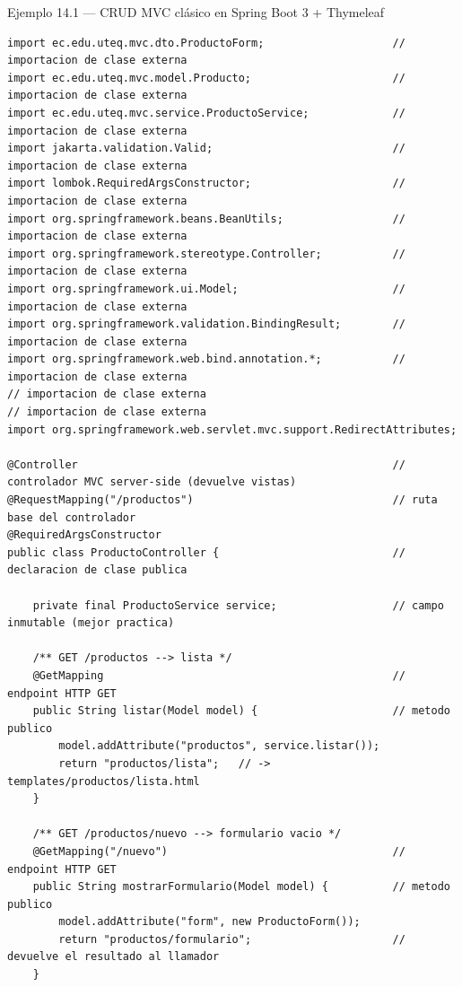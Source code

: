 \documentclass[11pt,a4paper,openany]{book}
\begin{document}
\begin{cajaejemplo}{Ejemplo 14.1 --- CRUD MVC clásico en Spring Boot 3 + Thymeleaf}
\begin{lstlisting}[style=java,caption={ProductoController.java},label=lst:14.6]
import ec.edu.uteq.mvc.dto.ProductoForm;                    // importacion de clase externa
import ec.edu.uteq.mvc.model.Producto;                      // importacion de clase externa
import ec.edu.uteq.mvc.service.ProductoService;             // importacion de clase externa
import jakarta.validation.Valid;                            // importacion de clase externa
import lombok.RequiredArgsConstructor;                      // importacion de clase externa
import org.springframework.beans.BeanUtils;                 // importacion de clase externa
import org.springframework.stereotype.Controller;           // importacion de clase externa
import org.springframework.ui.Model;                        // importacion de clase externa
import org.springframework.validation.BindingResult;        // importacion de clase externa
import org.springframework.web.bind.annotation.*;           // importacion de clase externa
// importacion de clase externa
// importacion de clase externa
import org.springframework.web.servlet.mvc.support.RedirectAttributes;

@Controller                                                 // controlador MVC server-side (devuelve vistas)
@RequestMapping("/productos")                               // ruta base del controlador
@RequiredArgsConstructor
public class ProductoController {                           // declaracion de clase publica

    private final ProductoService service;                  // campo inmutable (mejor practica)

    /** GET /productos --> lista */
    @GetMapping                                             // endpoint HTTP GET
    public String listar(Model model) {                     // metodo publico
        model.addAttribute("productos", service.listar());
        return "productos/lista";   // -> templates/productos/lista.html
    }

    /** GET /productos/nuevo --> formulario vacio */
    @GetMapping("/nuevo")                                   // endpoint HTTP GET
    public String mostrarFormulario(Model model) {          // metodo publico
        model.addAttribute("form", new ProductoForm());
        return "productos/formulario";                      // devuelve el resultado al llamador
    }


\end{lstlisting}
\end{cajaejemplo}
\end{document}

